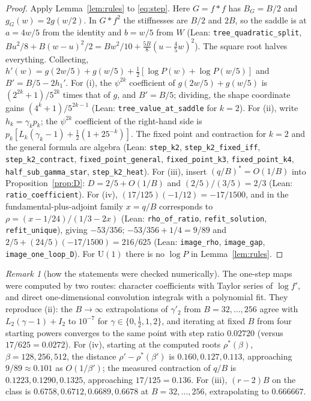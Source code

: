 \documentclass[11pt,a4paper]{article}
\theoremstyle{definition}
\theoremstyle{remark}
\newtheorem{remark}[lemma]{Remark}
\newcommand{\code}[1]{\texttt{#1}}
\begin{document}
\begin{proof}
Apply Lemma~\ref{lem:rules} to \eqref{eq:step}.
Here $G=f*f$ has $B_G=B/2$ and $g_G(w)=2g(w/2)$.
In $G*f^2$ the stiffnesses are $B/2$ and $2B$, so the saddle is at $a=4w/5$ from the identity and $b=w/5$ from $W$ (Lean: \code{tree\_quadratic\_split}, $Bu^2/8+B(w-u)^2/2=Bw^2/10+\tfrac{5B}8(u-\tfrac45w)^2$).
The square root halves everything.
Collecting, $h'(w)=g(2w/5)+g(w/5)+\tfrac12[\log P(w)+\log P(w/5)]$ and $B'=B/5-2h_1'$.
For (i), the $\psi^{2k}$ coefficient of $g(2w/5)+g(w/5)$ is $(2^{2k}+1)/5^{2k}$ times that of $g$, and $B'=B/5$; dividing, the shape coordinate gains $(4^k+1)/5^{2k-1}$ (Lean: \code{tree\_value\_at\_saddle} for $k=2$).
For (ii), write $h_k=\gamma_kp_k$; the $\psi^{2k}$ coefficient of the right-hand side is $p_k[L_k(\gamma_k-1)+\tfrac12(1+25^{-k})]$.
The fixed point and contraction for $k=2$ and the general formula are algebra (Lean: \code{step\_k2}, \code{step\_k2\_fixed\_iff}, \code{step\_k2\_contract}, \code{fixed\_point\_general}, \code{fixed\_point\_k3}, \code{fixed\_point\_k4}, \code{half\_sub\_gamma\_star}, \code{step\_k2\_heat}).
For (iii), insert $(q/B)^*=O(1/B)$ into Proposition~\ref{prop:D}: $D=2/5+O(1/B)$ and $(2/5)/(3/5)=2/3$ (Lean: \code{ratio\_coefficient}).
For (iv), $(17/125)(-1/12)=-17/1500$, and in the fundamental-plus-adjoint family $x=q/B$ corresponds to $\rho=(x-1/24)/(1/3-2x)$ (Lean: \code{rho\_of\_ratio}, \code{refit\_solution}, \code{refit\_unique}), giving $-53/356$; $-53/356+1/4=9/89$ and $2/5+(24/5)(-17/1500)=216/625$ (Lean: \code{image\_rho}, \code{image\_gap}, \code{image\_one\_loop\_D}).
For $\mathrm{U}(1)$ there is no $\log P$ in Lemma~\ref{lem:rules}.
\end{proof}

\begin{remark}[how the statements were checked numerically]
The one-step maps were computed by two routes: character coefficients with Taylor series of $\log f'$, and direct one-dimensional convolution integrals with a polynomial fit.
They reproduce (ii): the $B\to\infty$ extrapolations of $\gamma'_2$ from $B=32,\dots,256$ agree with $L_2(\gamma-1)+I_2$ to $10^{-7}$ for $\gamma\in\{0,\tfrac12,1,2\}$, and iterating at fixed $B$ from four starting powers converges to the same point with step ratio $0.02720$ (versus $17/625=0.0272$).
For (iv), starting at the computed roots $\rho^*(\beta)$, $\beta=128,256,512$, the distance $\rho'-\rho^*(\beta')$ is $0.160,0.127,0.113$, approaching $9/89\approx0.101$ as $O(1/\beta')$; the measured contraction of $q/B$ is $0.1223,0.1290,0.1325$, approaching $17/125=0.136$.
For (iii), $(r-2)B$ on the class is $0.6758,0.6712,0.6689,0.6678$ at $B=32,\dots,256$, extrapolating to $0.666667$.
\end{remark}
\end{document}
